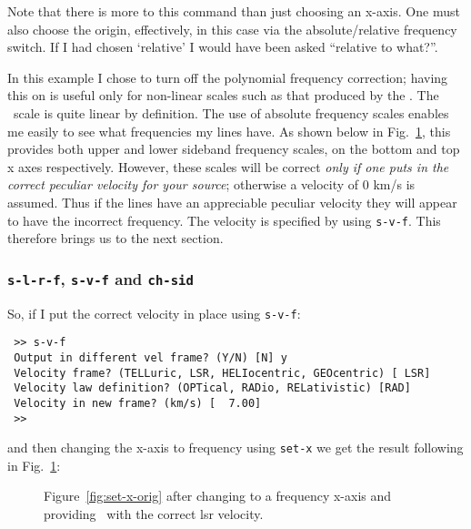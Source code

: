 Note that there is more to this command than just choosing an
x-axis. One must also choose the origin, effectively, in this case via
the absolute/relative frequency switch. If I had chosen `relative' I
would have been asked ``relative to what?''.

In this example I chose to turn off the polynomial frequency
correction; having this on is useful only for non-linear scales such as
that produced
by the \aosc . The \das\ scale is quite linear by definition. The use
of absolute frequency scales enables me easily to see what frequencies
my lines have. As shown below in Fig.~\ref{fig:set-x-to-freq}, 
this provides both upper and lower
sideband frequency scales, on the bottom and top x axes
respectively. However, these scales will be correct {\it only if one
puts in the correct peculiar velocity for your source}; otherwise a
velocity of 0 km/s is assumed. Thus if the lines have an appreciable
peculiar velocity they will appear to have the incorrect
frequency. The velocity is specified by using {\tt s-v-f}. This
therefore brings us to the next section.

\subsubsection{{\tt s-l-r-f}, {\tt s-v-f} and {\tt ch-sid}}
\label{sec:s-l-r-f}
So, if I put the correct velocity in place using {\tt s-v-f}:
\begin{verbatim}
 >> s-v-f
 Output in different vel frame? (Y/N) [N] y
 Velocity frame? (TELLuric, LSR, HELIocentric, GEOcentric) [ LSR] 
 Velocity law definition? (OPTical, RADio, RELativistic) [RAD] 
 Velocity in new frame? (km/s) [  7.00] 
 >> 
\end{verbatim}
and then changing the x-axis to frequency using {\tt set-x} we get the
result following in Fig.~\ref{fig:set-x-to-freq}:

\begin{figure}[ht]
\begin{minipage}[t]{\textwidth}
\begin{minipage}[b]{0.5\textwidth}
\leavevmode
\centering
\epsfxsize=2.3in
\end{minipage}
\hfill
\begin{minipage}[b]{0.45\textwidth}
\caption[A messy spectrum with reasonable axes]
{\small{Figure~\ref{fig:set-x-orig} after changing to a frequency
x-axis and providing \SPECX\ with the correct lsr velocity.
\vspace*{1cm}
}}
\label{fig:set-x-to-freq}
\end{minipage}
\end{minipage}
\end{figure}
   
